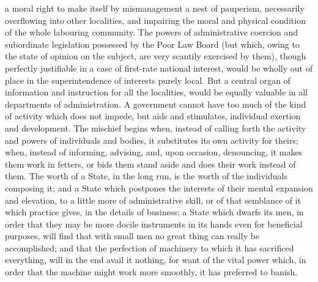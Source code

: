 \documentclass[12pt]{article}
\begin{document}
a moral right to make itself by mismanagement a nest of pauperism, necessarily overflowing into other localities, and impairing the moral and physical condition of the whole labouring community. The powers of administrative coercion and subordinate legislation possessed by the Poor Law Board (but which, owing to the state of opinion on the subject, are very scantily exercised by them), though perfectly justifiable in a case of first-rate national interest, would be wholly out of place in the superintendence of interests purely local. But a central organ of information and instruction for all the localities, would be equally valuable in all departments of administration. A government cannot have too much of the kind of activity which does not impede, but aids and stimulates, individual exertion and development. The mischief begins when, instead of calling forth the activity and powers of individuals and bodies, it substitutes its own activity for theirs; when, instead of informing, advising, and, upon occasion, denouncing, it makes them work in fetters, or bids them stand aside and does their work instead of them. The worth of a State, in the long run, is the worth of the individuals composing it; and a State which postpones the interests of their mental expansion and elevation, to a little more of administrative skill, or of that semblance of it which practice gives, in the details of business; a State which dwarfs its men, in order that they may be more docile instruments in its hands even for beneficial purposes, will find that with small men no great thing can really be accomplished; and that the perfection of machinery to which it has sacrificed everything, will in the end avail it nothing, for want of the vital power which, in order that the machine might work more smoothly, it has preferred to banish.

\end{document}
